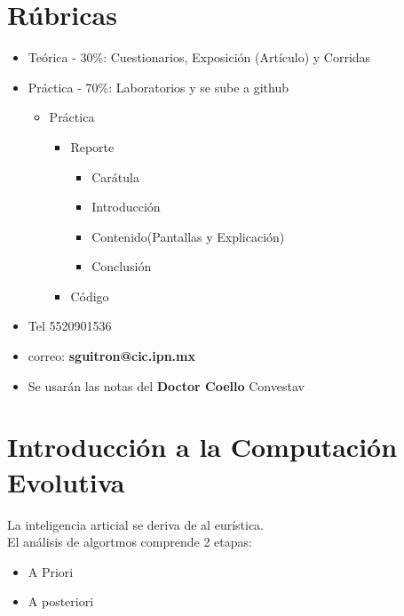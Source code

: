 \documentclass{article}
\begin{document}
\maketitle
\part{Rúbricas}
\begin{itemize}
	\item Teórica - 30\%: Cuestionarios, Exposición (Artículo) y Corridas
	\item Práctica - 70\%: Laboratorios y se sube a github
	\begin{itemize}
		\item[] Práctica
		\begin{itemize}
			\item[] Reporte
			\begin{itemize}
				\item Carátula
				\item Introducción
				\item Contenido(Pantallas y Explicación)
				\item Conclusión
			\end{itemize}
			\item[] Código
		\end{itemize}
	\end{itemize}
	\item Tel 5520901536
	\item correo: \textbf{sguitron@cic.ipn.mx}
	\item Se usarán las notas del \textbf{Doctor Coello} Convestav
\end{itemize}
\part{Introducción a la Computación Evolutiva}
La inteligencia articial se deriva de al eurística.\\
El análisis de algortmos comprende 2 etapas:\\
\begin{itemize}
	\item A Priori
	\item A posteriori
\end{itemize}
\end{document}
